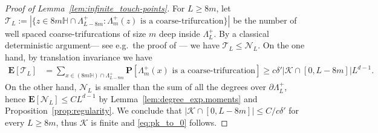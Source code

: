 \documentclass[11pt,a4paper]{article}
\theoremstyle{definition}
\numberwithin{equation}{section}
\begin{document}
\begin{proof}[Proof of Lemma~\textup{\ref{lem:infinite_touch-points}}]
For $L\geq 8m$, let $\mathcal{T}_L:=|\{z\in 8m\mathbb{H} \cap \Lambda^+_{L-8m}: \Lambda^+_m(z) \text{ is a coarse-trifurcation}\}|$ be the number of well spaced coarse-trifurcations of size $m$ deep inside $\Lambda^+_L$. By a classical deterministic argument--- see e.g.~the proof of \cite[Proposition 5.13]{GunaratnamPanagiotisPanisSeveroPhi42022}--- 
we have $\mathcal{T}_L\leq \mathcal{N}_L$. On the one hand, by translation invariance we have 
\begin{align*} 
\mathbf{E}[\mathcal{T}_L] &= \sum_{x\in (8m\mathbb{H})\cap\Lambda^+_{L-8m}} \mathbf{P}[\Lambda^+_m(x) \text{ is a coarse-trifurcation}]
\geq c\delta'|\mathcal{K}\cap [0,L-8m]| L^{d-1}.
\end{align*}
On the other hand, $\mathcal{N}_L$ is smaller than the sum of all the degrees over $\partial \Lambda^+_L$, hence $\mathbf{E}[\mathcal{N}_L]\leq CL^{d-1}$ by Lemma~\ref{lem:degree_exp.moments} and Proposition~\ref{prop:regularity}. We conclude that $|\mathcal{K}\cap [0,L-8m]|\leq C/c\delta'$ for every $L\geq 8m$, thus $\mathcal{K}$ is finite and \eqref{eq:pk_to_0} follows.


\end{proof}
\end{document}
